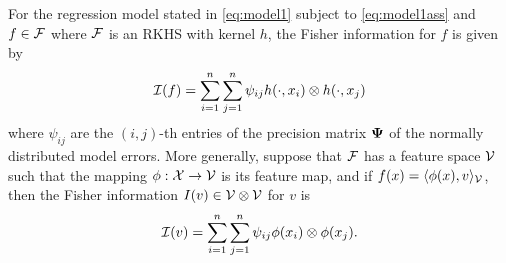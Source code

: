 \documentclass[a4paper,showframe,11pt,draft]{report}
\begin{document}
\begin{lemma}\label{thm:fisherregf}
  For the regression model stated in \eqref{eq:model1} subject to \eqref{eq:model1ass} and $f \in {\mathcal F}$ where ${\mathcal F}$ is an RKHS with kernel $h$, the Fisher information for $f$ is given by
  \[
    {\mathcal I}(f) = \sum_{i=1}^n\sum_{j=1}^n \psi_{ij} h(\cdot,x_i) \otimes h(\cdot,x_j)
  \]
  where $\psi_{ij}$ are the $(i,j)$-th entries of the precision matrix ${\bm\Psi}$ of the normally distributed model errors.
  More generally, suppose that ${\mathcal F}$ has a feature space ${\mathcal V}$ such that the mapping $\phi:{\mathcal X} \to {\mathcal V}$ is its feature map, and if $f(x)=\langle\phi(x),v\rangle_{\mathcal V}$, then the Fisher information $I(v) \in {\mathcal V} \otimes {\mathcal V}$ for $v$ is
  \[
    {\mathcal I}(v) = \sum_{i=1}^n\sum_{j=1}^n \psi_{ij} \phi(x_i) \otimes \phi(x_j).
  \]
\end{lemma}
\end{document}
